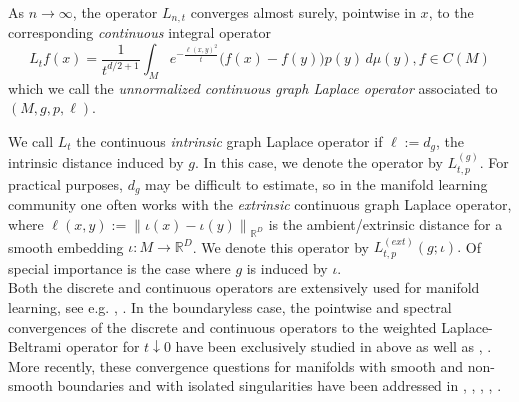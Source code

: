 \documentclass{amsart}
\let\oldcite\cite
\renewcommand{\cite}[1]{{\color{red}\oldcite{#1}}}
\let\oldcitet\citet
\renewcommand{\citet}[1]{{\color{red}\oldcitet{#1}}}
\theoremstyle{definition}
\theoremstyle{remark}
\newcommand{\nd}{\noindent}
\newcommand{\norm}[1]{\left\lVert#1\right\rVert}
\newcommand{\Ddim}{\mathbb{R}^D}
\newcommand{\0}{\boldsymbol{0}}
\begin{document}
\nd As $n\to\infty$, the operator $L_{n,t}$ converges almost surely, pointwise in $x$, to the
corresponding \textit{continuous} integral operator
\begin{equation}\label{eq:continuous_GL}
L_t f(x)
= \frac{1}{t^{d/2+1}} \int_M
  e^{-\frac{\ell(x,y)^2}{t}}\big(f(x)-f(y)\big) p(y)\,d\mu(y),  f \in C(M)
\end{equation}
which we call the \textit{unnormalized continuous graph Laplace operator} associated to $(M,g,p, \ell)$.

\nd We call $L_t$ the continuous \textit{intrinsic} graph Laplace operator if $\ell:=d_g$, the intrinsic
distance induced by $g$. In this case, we denote the operator by $L^{(g)}_{t,p}$. For practical
purposes, $d_g$ may be difficult to estimate, so in the manifold learning community one often works
with the \textit{extrinsic} continuous graph Laplace operator, where
$\ell(x,y):=\norm{\iota(x)-\iota(y)}_{\Ddim}$ is the ambient/extrinsic distance for a smooth embedding
$\iota:M\to {\Ddim}$. We denote this operator by $L^{(ext)}_{t,p}(g;\iota).$ Of special importance is the case where $g$ is induced by $\iota.$\\

 
\nd Both the discrete and continuous operators are extensively used for manifold learning, see e.g. \cite{BelkinNiyogiJCSS2008}, \cite{BelkinNiyogiNIPS2006}. In the boundaryless case, the pointwise and spectral convergences of the discrete and continuous operators to the weighted Laplace-Beltrami operator for $t\downarrow 0$ have been exclusively studied in above as well as \cite{HeinAudibertLuxburgJMLR2007}, \cite{HeinAudibertLuxburgNIPS2005}. More recently, these convergence questions for manifolds with smooth and non-smooth boundaries and with isolated singularities have been addressed in \citet{Belkin2012Boundary}, \cite{SingerWu2012}, \cite{SingerWu2017}, \cite{PalTewodrose2025}, \cite{Pal2025_AsymptoticsGraphLaplace_IsolatedSingularity}.\\
\end{document}
